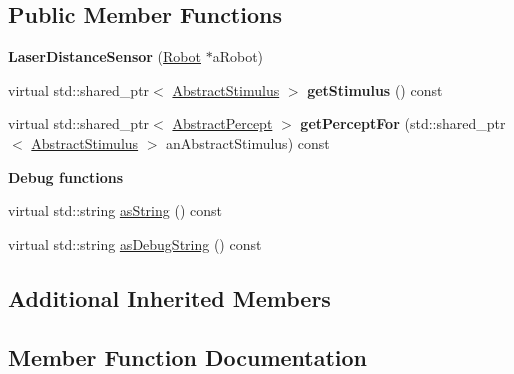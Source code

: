 \subsection*{Public Member Functions}
\begin{DoxyCompactItemize}
\item 
{\bfseries Laser\+Distance\+Sensor} (\hyperlink{class_model_1_1_robot}{Robot} $\ast$a\+Robot)\hypertarget{class_model_1_1_laser_distance_sensor_aa9686c425108f245858bb281acf15346}{}\label{class_model_1_1_laser_distance_sensor_aa9686c425108f245858bb281acf15346}

\item 
virtual std\+::shared\+\_\+ptr$<$ \hyperlink{class_model_1_1_abstract_stimulus}{Abstract\+Stimulus} $>$ {\bfseries get\+Stimulus} () const \hypertarget{class_model_1_1_laser_distance_sensor_a532a168e8d0f7f6986075e83ba58de3e}{}\label{class_model_1_1_laser_distance_sensor_a532a168e8d0f7f6986075e83ba58de3e}

\item 
virtual std\+::shared\+\_\+ptr$<$ \hyperlink{class_model_1_1_abstract_percept}{Abstract\+Percept} $>$ {\bfseries get\+Percept\+For} (std\+::shared\+\_\+ptr$<$ \hyperlink{class_model_1_1_abstract_stimulus}{Abstract\+Stimulus} $>$ an\+Abstract\+Stimulus) const \hypertarget{class_model_1_1_laser_distance_sensor_af3dc2140292c2e3def32b89e3e0a5e87}{}\label{class_model_1_1_laser_distance_sensor_af3dc2140292c2e3def32b89e3e0a5e87}

\end{DoxyCompactItemize}
\begin{Indent}{\bf Debug functions}\par
\begin{DoxyCompactItemize}
\item 
virtual std\+::string \hyperlink{class_model_1_1_laser_distance_sensor_a9403593acd21d557e5af1d79901fde34}{as\+String} () const 
\item 
virtual std\+::string \hyperlink{class_model_1_1_laser_distance_sensor_ab32d7cbfd19a9a5ec12a0c06ebb02b4f}{as\+Debug\+String} () const 
\end{DoxyCompactItemize}
\end{Indent}
\subsection*{Additional Inherited Members}


\subsection{Member Function Documentation}
